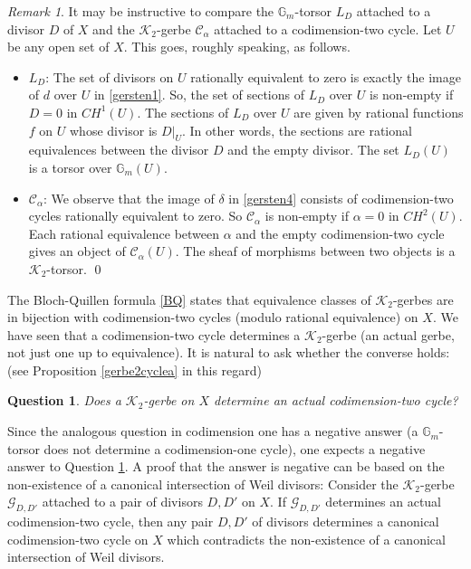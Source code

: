 \documentclass{amsart}
\numberwithin{equation}{subsection}
\newtheorem{question}[theorem]{Question}
\theoremstyle{remark}
\newtheorem{remark}[theorem]{Remark}
\theoremstyle{remark}
\newcommand{\cC}{\mathcal{C}}
\newcommand{\cG}{\mathcal{G}}
\newcommand{\cK}{\mathcal{K}}
\newcommand{\bbG}{\mathbb{G}}
\begin{document}
\begin{remark}\label{empty} It may be instructive to compare the $\bbG_m$-torsor $L_D$ attached to a divisor $D$ of $X$ and the $\cK_2$-gerbe $\cC_{\alpha}$ attached to a codimension-two cycle. Let $U$ be any open set of $X$. This goes, roughly speaking, as follows. 
\begin{itemize} 
\item $L_D$: The set of divisors on $U$ rationally equivalent to zero is exactly the image of $d$ over $U$ in \eqref{gersten1}. So, the set of sections of $L_D$ over $U$ is non-empty if $D =0$ in $CH^1(U)$. The sections of $L_D$ over $U$ are given by rational functions $f$ on $U$ whose divisor is $D|_U$. In other words, the sections are rational equivalences  between the divisor $D$ and the empty divisor. The set $L_D(U)$ is a torsor over $\bbG_m(U)$. 

\item $\cC_{\alpha}$: We observe that the image of $\delta$ in \eqref{gersten4} consists of codimension-two cycles rationally equivalent to zero. So $\cC_{\alpha}$ is non-empty if $\alpha = 0$ in $CH^2(U)$.   Each rational equivalence between $\alpha$ and the empty codimension-two cycle gives an object of $\cC_{\alpha}(U)$. The sheaf of morphisms between two objects is a $\cK_2$-torsor. \qed
\end{itemize}
\end{remark}


The Bloch-Quillen formula \eqref{BQ} states that equivalence classes of $\cK_2$-gerbes are in bijection with codimension-two cycles (modulo rational equivalence) on $X$. We have seen that a codimension-two cycle determines a $\cK_2$-gerbe (an actual gerbe, not just one up to equivalence). It is natural to ask whether the converse holds:  (see Proposition \ref{gerbe2cyclea} in this regard) 
\begin{question}\label{gerbe2cycle}
Does a $\cK_2$-gerbe on $X$ determine an actual codimension-two cycle?
\end{question}

Since the analogous question in codimension one has a negative answer (a $\mathbb G_m$-torsor does not determine a codimension-one cycle), one expects a negative answer to 
Question \ref{gerbe2cycle}. A proof that the answer is negative can be based on the non-existence of a canonical intersection of Weil divisors: Consider the $\cK_2$-gerbe $\cG_{D, D'}$ attached to a pair of divisors $D, D'$ on $X$. If $\cG_{D,D'}$ determines an actual codimension-two cycle, then any pair $D, D'$ of divisors  determines a canonical codimension-two cycle on $X$ which contradicts the non-existence of a canonical intersection of Weil divisors. 
\end{document}
